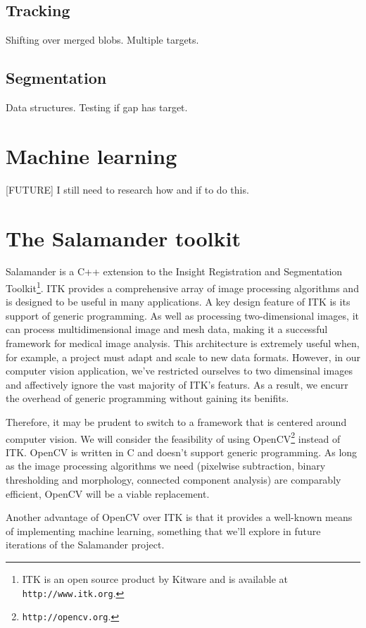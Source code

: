 \documentclass[letter]{article}
\newcounter{foot}
\begin{document}
\subsection{Tracking}

Shifting over merged blobs. 
Multiple targets. 

\subsection{Segmentation}
Data structures. 
Testing if gap has target. 

\section{Machine learning}
[FUTURE] I still need to research how and if to do this. 

 
\section{The Salamander toolkit}
Salamander is a C++ extension to the Insight Registration and Segmentation Toolkit\footnote
{ITK is an open source product by Kitware and is available at \texttt{http://www.itk.org}.}.
ITK provides a comprehensive array of image processing algorithms and is designed to 
be useful in many applications. A key design feature of ITK is its support of generic programming. 
As well as processing two-dimensional images, it can process multidimensional image and 
mesh data, making it a successful framework for medical image analysis. This architecture 
is extremely useful when, for example, a project must adapt and scale to new data formats. 
However, in our computer vision application, we've restricted ourselves to two dimensinal 
images and affectively ignore the vast majority of ITK's featurs. As a result, we encurr 
the overhead of generic programming without gaining its benifits. 

Therefore, it may be prudent to switch to a framework that is centered around computer 
vision. We will consider the feasibility of using OpenCV\footnote{\texttt{http://opencv.org}.} 
instead of ITK. OpenCV is written in C and doesn't support generic programming. As long
as the image processing algorithms we need (pixelwise subtraction, binary thresholding and
morphology, connected component analysis) are comparably efficient, OpenCV will be a 
viable replacement. 

Another advantage of OpenCV over ITK is that it provides a well-known means of implementing
machine learning, something that we'll explore in future iterations of the Salamander 
project. 
\end{document}
